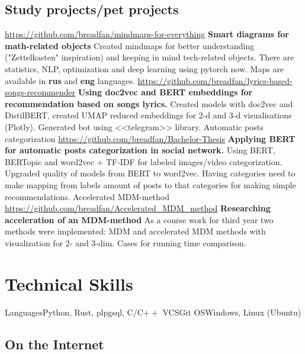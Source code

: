 \documentclass[11pt,a4paper]{moderncv}
\begin{document}
  \subsection{Study projects/pet projects}
  {\url{https://github.com/breadfan/mindmaps-for-everything}\newline{}
  	\textbf{Smart diagrams for math-related objects}\newline{}
  	Created mindmaps for better understanding ("Zettelkasten" inspiration) and keeping in mind tech-related objects. There are statistics, NLP, optimization and deep learning using pytorch now. Maps are available in \textbf{rus} and \textbf{eng} languages.	  
  }
  {\url{https://github.com/breadfan/lyrics-based-songs-recommender}\newline{}
  	\textbf{Using doc2vec and BERT embeddings for recommendation based on songs lyrics.}\newline{}
  	Created models with doc2vec and DistilBERT, created UMAP reduced embeddings for 2-d and 3-d visualisations (Plotly). Generated bot using <<telegram>> library.	  
  }
	\cvline
	{Automatic posts categorization}
	{\url{https://github.com/breadfan/Bachelor-Thesis}\newline{}
		\textbf{Applying BERT for automatic posts categorization in social network.} \newline{}
		Using BERT, BERTopic and word2vec + TF-IDF for labeled images/video categorization. \newline{}
		Upgraded quality of models from BERT to word2vec.\newline{}
		Having categories need to make mapping from labels amount of posts to that categories for making simple recommendations.
  }
  \cvline
  {Accelerated MDM-method}
  {\url{https://github.com/breadfan/Accelerated_MDM_method}\newline{}
  	\textbf{Researching acceleration of an MDM-method}\newline{}
  	As a course work for third year two methods were implemented: MDM and accelerated MDM methods with visualization for 2- and 3-dim. Cases for running time comparison.}

  	
  


\section{Technical Skills}
\cvline
  {Languages}{Python, Rust, plpgsql, C/C$++$}
\cvline
  {VCS}{Git}
\cvline
  {OS}{Windows, Linux (Ubuntu)}




 \subsection{On the Internet}
    
\end{document}
